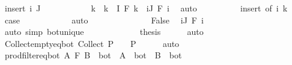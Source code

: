 \begin{isabellebody}
\ {\isacharparenleft}{\kern0pt}insert\ i\ J{\isacharparenright}{\kern0pt}\isanewline
\ \ \ \ \ \ \ \ \isamarkupfalse%
\ \isamarkupfalse%
\ k\ \ {\isachardoublequoteopen}k\ {\isasymin}\ I{\isachardoublequoteclose}\ {\isachardoublequoteopen}F\ k\ {\isasymle}\ {\isacharparenleft}{\kern0pt}{\isasymSqinter}i{\isasymin}J{\isachardot}{\kern0pt}\ F\ i{\isacharparenright}{\kern0pt}{\isachardoublequoteclose}\ \isamarkupfalse%
\ auto\isanewline
\ \ \ \ \ \ \ \ \isamarkupfalse%
\ insert\ {\isacharasterisk}{\kern0pt}{\isacharbrackleft}{\kern0pt}of\ i\ k{\isacharbrackright}{\kern0pt}\ \isamarkupfalse%
\ {\isacharquery}{\kern0pt}case\isanewline
\ \ \ \ \ \ \ \ \ \ \isamarkupfalse%
\ auto\isanewline
\ \ \ \ \ \ \isamarkupfalse%
\isanewline
\ \ \ \ \ \ \isamarkupfalse%
\ False\ \isamarkupfalse%
\ {\isachardoublequoteopen}{\isacharparenleft}{\kern0pt}{\isasymSqinter}i{\isasymin}J{\isachardot}{\kern0pt}\ F\ i{\isacharparenright}{\kern0pt}\ {\isasymnoteq}\ {\isasymbottom}{\isachardoublequoteclose}\isanewline
\ \ \ \ \ \ \ \ \isamarkupfalse%
\ {\isacharparenleft}{\kern0pt}auto\ simp{\isacharcolon}{\kern0pt}\ bot{\isacharunderscore}{\kern0pt}unique{\isacharparenright}{\kern0pt}\isanewline
\ \ \ \ \isamarkupfalse%
\isanewline
\ \ \isamarkupfalse%
\isanewline
\ \ \isamarkupfalse%
\ \isamarkupfalse%
\ {\isacharquery}{\kern0pt}thesis\isanewline
\ \ \ \ \isamarkupfalse%
\ auto\isanewline
{}\isamarkupfalse%
%
\endisatagproof
{\isafoldproof}%
%
\isadelimproof
\isanewline
%
\endisadelimproof
\isanewline
{}\isamarkupfalse%
\ Collect{\isacharunderscore}{\kern0pt}empty{\isacharunderscore}{\kern0pt}eq{\isacharunderscore}{\kern0pt}bot{\isacharcolon}{\kern0pt}\ {\isachardoublequoteopen}Collect\ P\ {\isacharequal}{\kern0pt}\ {\isacharbraceleft}{\kern0pt}{\isacharbraceright}{\kern0pt}\ {\isasymlongleftrightarrow}\ P\ {\isacharequal}{\kern0pt}\ {\isasymbottom}{\isachardoublequoteclose}\isanewline
%
\isadelimproof
\ \ %
\endisadelimproof
%
\isatagproof
{}\isamarkupfalse%
\ auto%
\endisatagproof
{\isafoldproof}%
%
\isadelimproof
\isanewline
%
\endisadelimproof
\isanewline
{}\isamarkupfalse%
\ prod{\isacharunderscore}{\kern0pt}filter{\isacharunderscore}{\kern0pt}eq{\isacharunderscore}{\kern0pt}bot{\isacharcolon}{\kern0pt}\ {\isachardoublequoteopen}A\ {\isasymtimes}\isactrlsub F\ B\ {\isacharequal}{\kern0pt}\ bot\ {\isasymlongleftrightarrow}\ A\ {\isacharequal}{\kern0pt}\ bot\ {\isasymor}\ B\ {\isacharequal}{\kern0pt}\ bot{\isachardoublequoteclose}\isanewline

\end{isabellebody}
